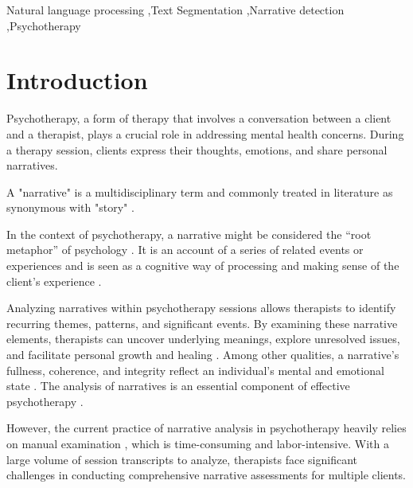 \documentclass[preprint,12pt]{elsarticle}
\begin{document}
\begin{frontmatter}
\begin{keyword}


Natural language processing  \sep Text Segmentation \sep Narrative detection \sep Psychotherapy
\end{keyword}

\end{frontmatter}

\section{Introduction}
Psychotherapy, a form of therapy that involves a conversation between a client and a therapist, plays a crucial role in addressing mental health concerns. During a therapy session, clients express their thoughts, emotions, and share personal narratives. 

A "narrative" is a multidisciplinary term and commonly treated in literature as synonymous with "story" \cite{norambuena2023survey}. 

In the context of psychotherapy, a narrative might be considered the “root metaphor” of psychology \cite{sarbin1986narrative}. It is an account of a series of related events or experiences and is seen as a cognitive way of processing and making sense of the client's experience \cite{hetrick2015back}.

Analyzing narratives within psychotherapy sessions allows therapists to identify recurring themes, patterns, and significant events. By examining these narrative elements, therapists can uncover underlying meanings, explore unresolved issues, and facilitate personal growth and healing  \cite{wong2018narrative}.  Among other qualities, a narrative's fullness, coherence, and integrity reflect an individual's mental and emotional state \cite{duero2018phenomenological}. The analysis of narratives is an essential component of effective psychotherapy  \cite{botella2011narrative}. 

However, the current practice of narrative analysis in psychotherapy heavily relies on manual examination \cite{angus1994narrative,gonccalves2010innovative,botella2011narrative}, which is time-consuming and labor-intensive. With a large volume of session transcripts to analyze, therapists face significant challenges in conducting comprehensive narrative assessments for multiple clients. 
\end{document}
